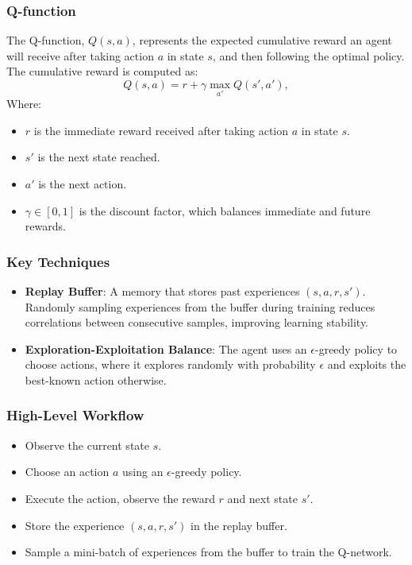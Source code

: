 \documentclass[11pt,a4paper]{article}
\newcommand{\mlist}[1]{\begin{itemize}[noitemsep,topsep=0pt]#1\end{itemize}}
\begin{document}
            \subsubsection*{Q-function}
The Q-function, $Q(s, a)$, represents the expected cumulative reward an agent will receive after taking action $a$ in state $s$, and then following the optimal policy. The cumulative reward is computed as:
\[Q(s, a) = r + \gamma \max_{a'} Q(s', a'),\]
Where:
\mlist{
\item $r$ is the immediate reward received after taking action $a$ in state $s$.
\item $s'$ is the next state reached.
\item $a'$ is the next action.
\item $\gamma \in [0, 1]$ is the discount factor, which balances immediate and future rewards.
}
    
            \subsubsection*{Key Techniques}
\mlist{
    \item \textbf{Replay Buffer}: A memory that stores past experiences $(s, a, r, s')$. Randomly sampling experiences from the buffer during training reduces correlations between consecutive samples, improving learning stability.
    \item \textbf{Exploration-Exploitation Balance}: The agent uses an $\epsilon$-greedy policy to choose actions, where it explores randomly with probability $\epsilon$ and exploits the best-known action otherwise.
}
    
            \subsubsection*{High-Level Workflow}
\mlist{
\item Observe the current state $s$.
\item Choose an action $a$ using an $\epsilon$-greedy policy.
\item Execute the action, observe the reward $r$ and next state $s'$.
\item Store the experience $(s, a, r, s')$ in the replay buffer.
\item Sample a mini-batch of experiences from the buffer to train the Q-network.
}
    
\end{document}
